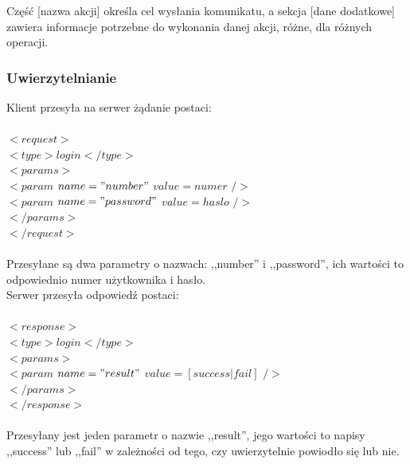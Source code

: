 \documentclass[a4paper,12pt]{article}
\begin{document}
\noindent Część [nazwa akcji] określa cel wysłania komunikatu, a sekcja [dane dodatkowe] zawiera
informacje potrzebne do wykonania danej akcji, różne, dla różnych operacji.

\subsubsection[Uwierzytelnianie]{Uwierzytelnianie}
Klient przesyła na serwer żądanie postaci:\\\\
\noindent  $<request>$\\
\indent    $<type>login</type>$\\
\indent    $<params>$\\
\indent \indent $<param$ $name="number"$ $value=numer$ $/>$\\
\indent \indent $<param$ $name="password"$ $value=haslo$ $/>$\\
\indent    $</params>$\\
$</request>$\\\\

\noindent Przesyłane są dwa parametry o nazwach: ,,number'' i ,,password'', ich wartości to odpowiednio numer użytkownika i hasło.\\
Serwer przesyła odpowiedź postaci:\\\\
\noindent  $<response>$\\
\indent    $<type>login</type>$\\
\indent    $<params>$\\
\indent \indent $<param$ $name="result"$ $value=[success|fail]$ $/>$\\
\indent    $</params>$\\
$</response>$\\\\
\noindent Przesyłany jest jeden parametr o nazwie ,,result'', jego wartości to napisy ,,success'' lub ,,fail'' w zależności od tego, czy uwierzytelnie powiodło się lub nie.
\end{document}
